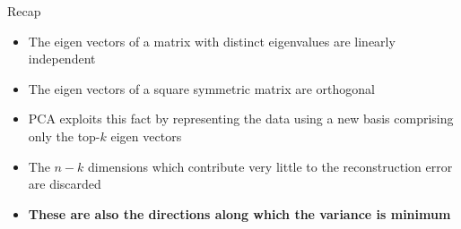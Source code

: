 \begin{frame}
  \begin{overlayarea}{\textwidth}{\textheight}
    \begin{block}{Recap}
      \begin{itemize}\justifying
        \item<1-> The eigen vectors of a matrix with distinct eigenvalues are linearly independent
        \item<2-> The eigen vectors of a square symmetric matrix are orthogonal
        \item<3-> PCA exploits this fact by representing the data using a new basis comprising only the top-$k$ eigen vectors
        \item<4-> The $n-k$ dimensions which contribute very little to the reconstruction error are discarded
        \item<5-> \textbf{These are also the directions along which the variance is minimum}
      \end{itemize}
    \end{block}
  \end{overlayarea}
\end{frame}

